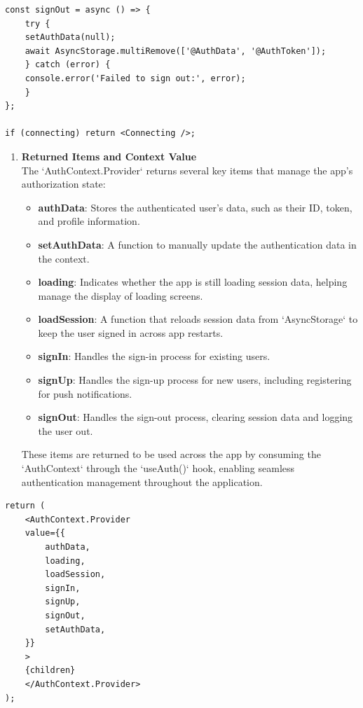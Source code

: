 \begin{lstlisting}[caption={Sign Out Function}]
const signOut = async () => {
    try {
    setAuthData(null);
    await AsyncStorage.multiRemove(['@AuthData', '@AuthToken']);
    } catch (error) {
    console.error('Failed to sign out:', error);
    }
};

if (connecting) return <Connecting />;
\end{lstlisting}   

\begin{enumerate}[resume]
    \item \textbf{Returned Items and Context Value} \\
    The `AuthContext.Provider` returns several key items that manage the app's authorization state:
    \begin{itemize}
        \item \textbf{authData}: Stores the authenticated user’s data, such as their ID, token, and profile information.
        \item \textbf{setAuthData}: A function to manually update the authentication data in the context.
        \item \textbf{loading}: Indicates whether the app is still loading session data, helping manage the display of loading screens.
        \item \textbf{loadSession}: A function that reloads session data from `AsyncStorage` to keep the user signed in across app restarts.
        \item \textbf{signIn}: Handles the sign-in process for existing users.
        \item \textbf{signUp}: Handles the sign-up process for new users, including registering for push notifications.
        \item \textbf{signOut}: Handles the sign-out process, clearing session data and logging the user out.
    \end{itemize}
    These items are returned to be used across the app by consuming the `AuthContext` through the `useAuth()` hook, enabling seamless authentication management throughout the application.
\end{enumerate}

\begin{lstlisting}[caption={Return Values from Auth Context}]
return (
    <AuthContext.Provider
    value={{
        authData,
        loading,
        loadSession,
        signIn,
        signUp,
        signOut,
        setAuthData,
    }}
    >
    {children}
    </AuthContext.Provider>
);
\end{lstlisting}

